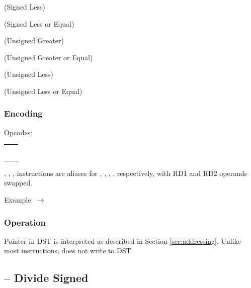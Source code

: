 \documentclass[a4paper,12pt,twoside,extrafontsizes]{memoir}
\begin{document}
{ (Signed Less)

 (Signed Less or Equal)

 (Unsigned Greater)

 (Unsigned Greater or Equal)

 (Unsigned Less)

 (Unsigned Less or Equal)

\subsubsection{Encoding}


Opcodes:

\begin{tabularx}{\textwidth}{lL}
   &  \\
  &  \\
  &  \\
 &  \\
  &  \\
 &  \\
\end{tabularx}

, , ,  instructions are aliases for , , , , respectively, with RD1 and RD2 operands swapped.

Example:  $\rightarrow$ 

\subsubsection{Operation}


Pointer in DST is interpreted as described in Section \ref{sec:addressing}. Unlike most instructions,  does not write to DST.

\subsection{ -- Divide Signed}
\label{subsec:instr:divs}

}
\end{document}
